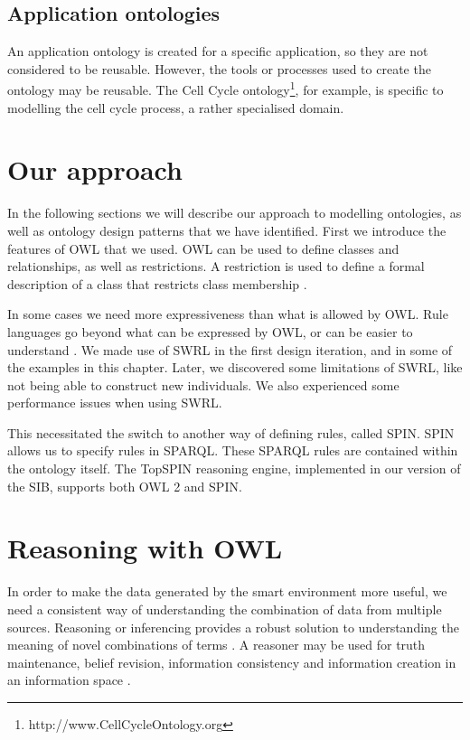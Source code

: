 \subsection{Application ontologies} 
An application ontology is created for a specific application, so they are not considered to be reusable. However, the tools or processes used to create the ontology may be reusable. The Cell Cycle ontology\footnote{http://www.CellCycleOntology.org}, for example, is specific to modelling the cell cycle process, a rather specialised domain.


\section{Our approach}

In the following sections we will describe our approach to modelling ontologies, as well as ontology design patterns that we have identified. First we introduce the features of \ac{OWL} that we used. \ac{OWL} can be used to define classes and relationships, as well as restrictions. A restriction is used to define a formal description of a class that restricts class membership \cite{Allemang2011}. 

In some cases we need more expressiveness than what is allowed by \ac{OWL}. Rule languages go beyond what can be expressed by \ac{OWL}, or can be easier to understand \cite{Hebeler2009}. We made use of \ac{SWRL} in the first design iteration, and in some of the examples in this chapter. Later, we discovered some limitations of \ac{SWRL}, like not being able to construct new individuals. We also experienced some performance issues when using \ac{SWRL}.

This necessitated the switch to another way of defining rules, called \ac{SPIN}. \ac{SPIN} allows us to specify rules in \ac{SPARQL}. These \ac{SPARQL} rules are contained within the ontology itself. The TopSPIN reasoning engine, implemented in our version of the \ac{SIB}, supports both \ac{OWL} 2 and \ac{SPIN}.



\section{Reasoning with OWL}
\label{owlreasoning}
In order to make the data generated by the smart environment more useful, we need a consistent way of understanding the combination of data from multiple sources. Reasoning or inferencing provides a robust solution to understanding the meaning of novel combinations of terms \cite{Hebeler2009}. A reasoner may be used for truth maintenance, belief revision, information consistency and information creation in an information space \cite{Oliver2008}.

